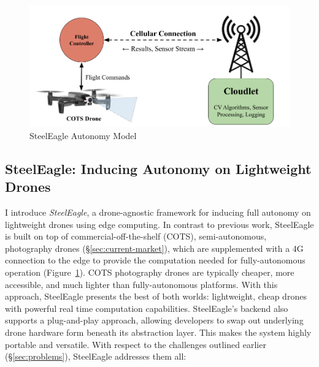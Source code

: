 \begin{figure}
    \centering
    \includegraphics[width=1.0\linewidth]{chapter2/FIGS/simplearch.png}
    \caption{SteelEagle Autonomy Model}
    \label{fig:steeleagle-model}
\end{figure}

\subsection{SteelEagle: Inducing Autonomy on Lightweight Drones}
I introduce \textit{SteelEagle}, a drone-agnostic framework for inducing full autonomy on lightweight drones using edge computing. In contrast to previous work, SteelEagle is built on top of commercial-off-the-shelf (COTS), semi-autonomous, photography drones (\S\ref{sec:current-market}), which are supplemented with a 4G~\cite{ETSI} connection to the edge to provide the computation needed for fully-autonomous operation (Figure~\ref{fig:steeleagle-model}). COTS photography drones are typically cheaper, more accessible, and much lighter than fully-autonomous platforms. With this approach, SteelEagle presents the best of both worlds: lightweight, cheap drones with powerful real time computation capabilities. SteelEagle's backend also supports a plug-and-play approach, allowing developers to swap out underlying drone hardware form beneath its abstraction layer. This makes the system highly portable and versatile. With respect to the challenges outlined earlier (\S\ref{sec:problems}), SteelEagle addresses them all:

